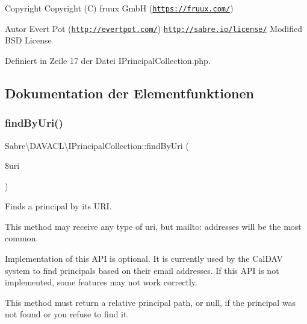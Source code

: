 \begin{DoxyCopyright}{Copyright}
Copyright (C) fruux GmbH (\href{https://fruux.com/}{\tt https\+://fruux.\+com/}) 
\end{DoxyCopyright}
\begin{DoxyAuthor}{Autor}
Evert Pot (\href{http://evertpot.com/}{\tt http\+://evertpot.\+com/})  \href{http://sabre.io/license/}{\tt http\+://sabre.\+io/license/} Modified B\+SD License 
\end{DoxyAuthor}


Definiert in Zeile 17 der Datei I\+Principal\+Collection.\+php.



\subsection{Dokumentation der Elementfunktionen}
\mbox{\label{interface_sabre_1_1_d_a_v_a_c_l_1_1_i_principal_collection_a7b8893f6a37a399cf37afe5dfda85d33}} 
\subsubsection{\texorpdfstring{find\+By\+Uri()}{findByUri()}}
{\footnotesize\ttfamily Sabre\textbackslash{}\+D\+A\+V\+A\+C\+L\textbackslash{}\+I\+Principal\+Collection\+::find\+By\+Uri (\begin{DoxyParamCaption}\item[{}]{\$uri }\end{DoxyParamCaption})}

Finds a principal by its U\+RI.

This method may receive any type of uri, but mailto\+: addresses will be the most common.

Implementation of this A\+PI is optional. It is currently used by the Cal\+D\+AV system to find principals based on their email addresses. If this A\+PI is not implemented, some features may not work correctly.

This method must return a relative principal path, or null, if the principal was not found or you refuse to find it.


